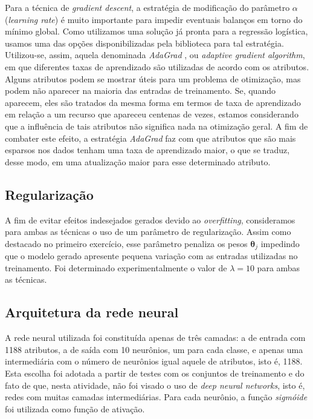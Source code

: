 \documentclass[10pt,twocolumn,letterpaper]{article}
\begin{document}
Para a técnica de \textit{gradient descent}, a estratégia de modificação do parâmetro \(\alpha\) (\textit{learning rate}) é muito importante para impedir eventuais balanços em torno do mínimo global. Como utilizamos uma solução já pronta para a regressão logística, usamos uma das opções disponibilizadas pela biblioteca para tal estratégia. Utilizou-se, assim, aquela denominada \textit{AdaGrad} \cite{Duchi:2011:ASM:1953048.2021068}, ou \textit{adaptive gradient algorithm}, em que diferentes taxas de aprendizado são utilizadas de acordo com os atributos. Alguns atributos podem se mostrar úteis para um problema de otimização, mas podem não aparecer na maioria das entradas de treinamento. Se, quando aparecem, eles são tratados da mesma forma em termos de taxa de aprendizado em relação a um recurso que apareceu centenas de vezes, estamos considerando que a influência de tais atributos não significa nada na otimização geral. A fim de combater este efeito, a estratégia \textit{AdaGrad} faz com que atributos que são mais esparsos nos dados tenham uma taxa de aprendizado maior, o que se traduz, desse modo, em uma atualização maior para esse determinado atributo.

\subsection{Regularização}

A fim de evitar efeitos indesejados gerados devido ao \textit{overfitting}, consideramos para ambas as técnicas o uso de um parâmetro de regularização. Assim como destacado no primeiro exercício, esse parâmetro penaliza os pesos \(\bm{\theta}_j\) impedindo que o modelo gerado apresente pequena variação com as entradas utilizadas no treinamento. Foi determinado experimentalmente o valor de \(\lambda = 10\) para ambas as técnicas.

\subsection {Arquitetura da rede neural}

A rede neural utilizada foi constituída apenas de três camadas: a de entrada com 1188 atributos, a de saída com 10 neurônios, um para cada classe, e apenas uma intermediária com o número de neurônios igual aquele de atributos, isto é, 1188. Esta escolha foi adotada a partir de testes com os conjuntos de treinamento e do fato de que, nesta atividade, não foi visado o uso de \textit{deep neural networks}, isto é, redes com muitas camadas intermediárias. Para cada neurônio, a função \textit{sigmóide} foi utilizada como função de ativação.
\end{document}
